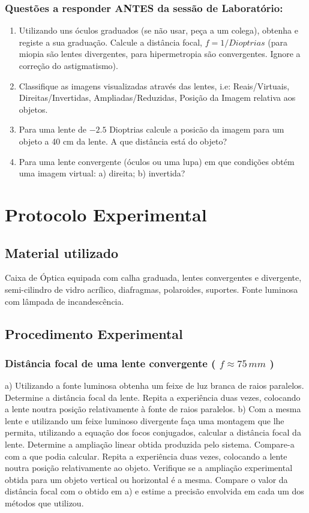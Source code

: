 \documentclass[a4paper,12pt]{article}      %
\begin{document}
\subsubsection{\sf Questões a responder ANTES da sessão de Laboratório:}
\begin{enumerate}
\item Utilizando uns óculos graduados (se não usar, peça a um colega), obtenha e registe a sua graduação. Calcule a distância focal, $f=1/Dioptrias$ (para miopia são lentes divergentes, para hipermetropia são convergentes. Ignore  a correção do astigmatismo).
\item Classifique as imagens visualizadas através das lentes, i.e: Reais/Virtuais, Direitas/Invertidas, Ampliadas/Reduzidas, Posição da Imagem relativa aos objetos.
\item Para uma lente de $-2.5$ Dioptrias calcule a posicão da imagem para um objeto a 40 cm da lente. A que distância está do objeto?
\item Para uma lente convergente (óculos ou uma lupa) em que condições obtém uma imagem virtual: a) direita; b) invertida?
\end{enumerate}

\newpage
\section{\sf Protocolo Experimental}
\subsection{\sf Material utilizado}
Caixa de Óptica equipada com calha graduada, lentes convergentes e divergente, semi-cilindro de 
vidro acrílico, diafragmas, polaroides, suportes. Fonte luminosa com lâmpada de incandescência. 

\subsection{\sf Procedimento Experimental}
\subsubsection{\sf   Distância focal de uma lente convergente ( $f  ≈  75\, mm$ ) }
 
a)  Utilizando  a  fonte  luminosa  obtenha  um  feixe  de  luz  branca  de  raios  paralelos.
Determine  a  distância  focal  da  lente.  Repita  a  experiência  duas  vezes,  colocando  a  lente 
noutra posição relativamente à fonte de raios paralelos. 
b) Com a mesma lente e utilizando um feixe luminoso divergente faça uma montagem que 
lhe permita, utilizando a equação dos focos conjugados, calcular a distância focal da lente. 
Determine a ampliação linear obtida produzida pelo sistema. Compare-a com a que podia 
calcular. 
Repita a experiência duas vezes, colocando a lente noutra posição relativamente ao objeto. 
Verifique  se  a  ampliação  experimental  obtida  para  um  objeto  vertical  ou  horizontal  é  a 
mesma.  
Compare o valor da distância focal com o obtido em a) e estime a precisão envolvida em 
cada um dos métodos que utilizou. 
\end{document}
